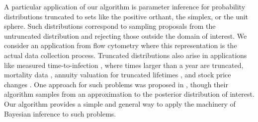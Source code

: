 A particular application of our algorithm is parameter inference for probability distributions truncated
to sets like the positive orthant, the simplex, or the unit sphere.
Such distributions correspond to sampling proposals from the untruncated distribution and rejecting those outside the domain of interest. 
We consider an application from flow cytometry where this representation is the actual data collection process.
Truncated distributions also arise in applications like measured time-to-infection \citep{Goeth09}, where times larger than a year are truncated,
mortality data \citep{Alai2013}, annuity valuation for truncated lifetimes  \citep{Alai2013}, and
stock price changes \citep{aban06}. One approach for such problems was proposed in \cite{leich09}, though their algorithm samples from an
approximation to the posterior distribution of interest. Our algorithm provides a simple and general way to apply the machinery of Bayesian inference 
to such problems.


